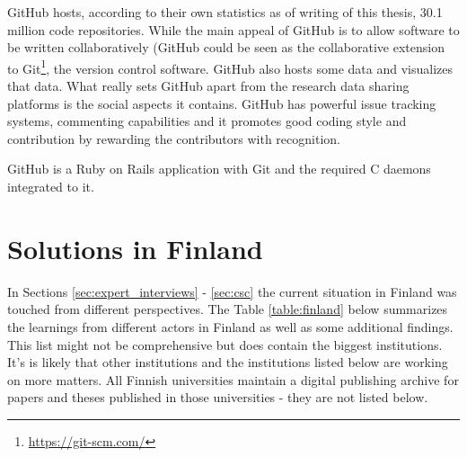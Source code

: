 GitHub hosts, according to their own statistics as of writing of this thesis,
30.1 million code repositories. While the main appeal of GitHub is to allow
software to be written collaboratively (GitHub could be seen as the
collaborative extension to Git\footnote{\url{https://git-scm.com/}}, the
version control software. GitHub also hosts some data and visualizes that data.
What really sets GitHub apart from the research data sharing platforms is the
social aspects it contains. GitHub has powerful issue tracking systems,
commenting capabilities and it promotes good coding style and contribution
by rewarding the contributors with recognition.

GitHub is a Ruby on Rails application with Git and the required C daemons
integrated to it.

\clearpage

\section{Solutions in Finland}
\label{sec:finland_current}

In Sections \ref{sec:expert_interviews} - \ref{sec:csc} the current situation
in Finland was touched from different perspectives. The Table \ref{table:finland} below summarizes
the learnings from different actors in Finland as well as some additional
findings. This list might not be comprehensive but does contain the biggest
institutions. It's is likely that other institutions and the institutions listed
below are working on more matters. All Finnish universities maintain a digital
publishing archive for papers and theses published in those universities - they
are not listed below.

